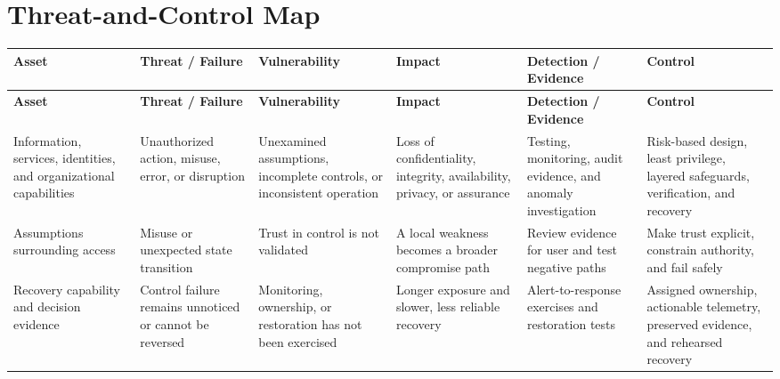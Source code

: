 \documentclass[11pt,letterpaper]{article}
\begin{document}
\section*{Threat-and-Control Map}
\begingroup\scriptsize\setlength{\tabcolsep}{2pt}
\begin{longtable}{>{\raggedright\arraybackslash}p{}>{\raggedright\arraybackslash}p{}>{\raggedright\arraybackslash}p{}>{\raggedright\arraybackslash}p{}>{\raggedright\arraybackslash}p{}>{\raggedright\arraybackslash}p{}}
\toprule\rowcolor{Navy}\color{white}\textbf{Asset} & \color{white}\textbf{Threat / Failure} & \color{white}\textbf{Vulnerability} & \color{white}\textbf{Impact} & \color{white}\textbf{Detection / Evidence} & \color{white}\textbf{Control}\\\midrule
\endfirsthead
\toprule\rowcolor{Navy}\color{white}\textbf{Asset} & \color{white}\textbf{Threat / Failure} & \color{white}\textbf{Vulnerability} & \color{white}\textbf{Impact} & \color{white}\textbf{Detection / Evidence} & \color{white}\textbf{Control}\\\midrule
\endhead
Information, services, identities, and organizational capabilities & Unauthorized action, misuse, error, or disruption & Unexamined assumptions, incomplete controls, or inconsistent operation & Loss of confidentiality, integrity, availability, privacy, or assurance & Testing, monitoring, audit evidence, and anomaly investigation & Risk-based design, least privilege, layered safeguards, verification, and recovery\\\midrule
Assumptions surrounding access & Misuse or unexpected state transition & Trust in control is not validated & A local weakness becomes a broader compromise path & Review evidence for user and test negative paths & Make trust explicit, constrain authority, and fail safely\\\midrule
Recovery capability and decision evidence & Control failure remains unnoticed or cannot be reversed & Monitoring, ownership, or restoration has not been exercised & Longer exposure and slower, less reliable recovery & Alert-to-response exercises and restoration tests & Assigned ownership, actionable telemetry, preserved evidence, and rehearsed recovery\\\midrule
\bottomrule
\end{longtable}
\endgroup
\end{document}
